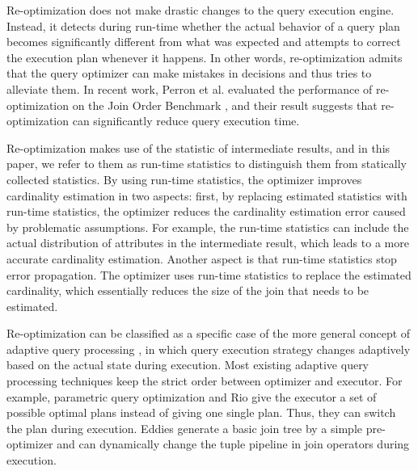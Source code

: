     Re-optimization does not make drastic changes to the query execution engine. Instead, it detects during run-time whether the actual behavior of a query plan becomes significantly different from what was expected and attempts to correct the execution plan whenever it happens. In other words, re-optimization admits that the query optimizer can make mistakes in decisions and thus tries to alleviate them. In recent work, Perron et al. \cite{MichaelStonebraker} evaluated the performance of re-optimization on the Join Order Benchmark \cite{JOB}, and their result suggests that re-optimization can significantly reduce query execution time.\par
    Re-optimization makes use of the statistic of intermediate results, and in this paper, we refer to them as run-time statistics to distinguish them from statically collected statistics. By using run-time statistics, the optimizer improves cardinality estimation in two aspects: first, by replacing estimated statistics with run-time statistics, the optimizer reduces the cardinality estimation error caused by problematic assumptions. For example, the run-time statistics can include the actual distribution of attributes in the intermediate result, which leads to a more accurate cardinality estimation. Another aspect is that run-time statistics stop error propagation. The optimizer uses run-time statistics to replace the estimated cardinality, which essentially reduces the size of the join that needs to be estimated.\par
    Re-optimization can be classified as a specific case of the more general concept of adaptive query processing \cite{paper47}, in which query execution strategy changes adaptively based on the actual state during execution. Most existing adaptive query processing techniques keep the strict order between optimizer and executor. For example, parametric query optimization \cite{paper44} and Rio \cite{paper25} give the executor a set of possible optimal plans instead of giving one single plan. Thus, they can switch the plan during execution. Eddies \cite{paper30} generate a basic join tree by a simple pre-optimizer and can dynamically change the tuple pipeline in join operators during execution.

